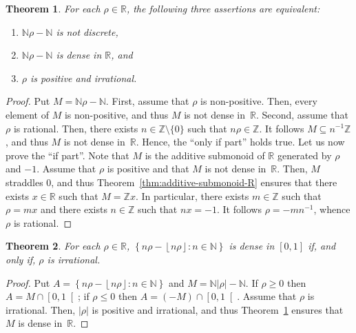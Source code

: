 \documentclass[12pt]{article}
\newcommand{\bZ}{\mathbb{Z}}
\newcommand{\bN}{\mathbb{N}} %
\newcommand{\bR}{\mathbb{R}}
\newcommand{\floor}[1]{\left\lfloor #1  \right\rfloor}
\newcommand{\abs}[1]{\left| #1 \right|}
\newtheorem{theorem}{Theorem}
\theoremstyle{definition}
\begin{document}

 \begin{theorem} \label{thm:Nr-N}
   For each $\rho \in \bR$,
   the following three assertions are equivalent:
     \begin{enumerate}
     \item $\bN \rho - \bN$ is not discrete, \label{ass:Nr-N:discrete}
     \item $\bN \rho - \bN$ is dense in $\bR$, and  \label{ass:Nr-N:dense}
    \item  $\rho$ is positive and irrational. \label{ass:Nr-N:irrational}
    \end{enumerate} 
\end{theorem}

\begin{proof}
  Put $M = \bN \rho - \bN$.
  First, assume that $\rho$ is non-positive.
  Then, every element of $M$ is non-positive, and thus $M$ is not dense in~$\bR$.
  Second, assume that $\rho$ is rational.
  Then, there exists $n \in \bZ \setminus \{ 0 \}$ such that $n \rho \in \bZ$.
  It follows $M \subseteq n^{-1} \bZ$, and thus $M$ is not dense in~$\bR$.
  Hence, the ``only if part'' holds true.
  Let us now prove the ``if part''.
  Note that $M$ is the additive submonoid of $\bR$ generated by $\rho$ and $- 1$.
  Assume that $\rho$ is positive and that $M$ is not dense in~$\bR$.
  Then, $M$ straddles $0$,
  and thus Theorem~\ref{thm:additive-submonoid-R} ensures that there exists $x \in \bR$ such that $M = \bZ x$.
  In particular, there exists $m \in \bZ$ such that $\rho = m x$ and there exists $n \in \bZ$ such that $n x = - 1$.
  It follows $\rho = - m n^{-1}$, whence $\rho$ is rational.
\end{proof}

\begin{theorem}
  For each $\rho \in \bR$,
   $\left\{ n \rho - \floor{n \rho} : n \in \bN \right\}$ is dense in $[0, 1]$ if, and only if,
   $\rho$ is irrational.
 \end{theorem}

 \begin{proof}
   Put
   $A = \left\{ n \rho - \floor{n \rho} : n \in \bN \right\}$ and $M = \bN \abs{ \rho } - \bN$.
   If $\rho \ge 0$ then $A = M \cap \left[0, 1 \right[$;
   if $\rho \le 0$ then $A = (- M) \cap \left[0, 1 \right[$.
   Assume that $\rho$ is irrational.
   Then, $\abs{\rho}$ is positive and irrational, and thus Theorem~\ref{thm:Nr-N} ensures that $M$ is dense in~$\bR$.
   
   
   
  \end{proof}
 

 



\end{document}
